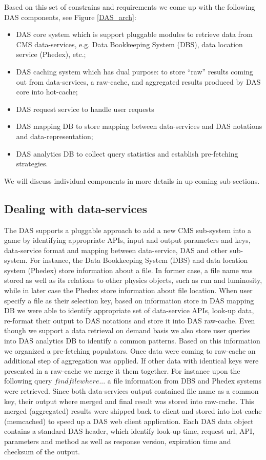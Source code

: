 \documentclass[a4paper]{jpconf}
\begin{document}
Based on this set of constrains and requirements we come up with the following
DAS components, see Figure \ref{DAS_arch}:
\begin{itemize}
\item DAS core system which is support pluggable modules to retrieve data from
CMS data-services, e.g. Data Bookkeeping System (DBS), data location service (Phedex),
etc.;
\item DAS caching system which has dual purpose: to store ``raw'' results coming
out from data-services, a raw-cache, and aggregated results produced by DAS core into
hot-cache;
\item DAS request service to handle user requests
\item DAS mapping DB to store mapping between data-services and DAS notations and
data-representation;
\item DAS analytics DB to collect query statistics and establish pre-fetching 
strategies.
\end{itemize}
We will discuss individual components in more details in up-coming sub-sections.

\subsection{Dealing with data-services}
The DAS supports a pluggable approach to add a new CMS sub-system into a game by
identifying appropriate APIs, input and output parameters and keys, data-service
format and mapping between data-service, DAS and other sub-system. For instance,
the Data Bookkeeping System (DBS) and data location system (Phedex) store information about
a file. In former case, a file name was stored as well as its relations to other physics 
objects, such as run and luminosity, while in later case the Phedex store information 
about file location. When user specify a file as their selection key, based on
information store in DAS mapping DB we were able to identify appropriate set of
data-service APIs, look-up data, re-format their output to DAS notations and
store it into DAS raw-cache. Even though we support a data retrieval on demand
basis we also store user queries into DAS analytics DB to identify
a common patterns. Based on this information we organized a pre-fetching
populators. Once data were coming to raw-cache an additional step of
aggregation was applied. If other data with identical keys were presented in
a raw-cache we merge it them together. For instance upon the following query
$find file where ... $ a file information from DBS and Phedex systems were
retrieved. Since both data-services output contained file name as a common
key, their output where merged and final result was stored into raw-cache.
This merged (aggregated) results were shipped back to client and stored into
hot-cache (memcached) to speed up a DAS web client application. Each DAS data
object contains a standard DAS header, which identify look-up time,
request url, API, parameters and method as well as response version, expiration
time and checksum of the output. 
\end{document}
